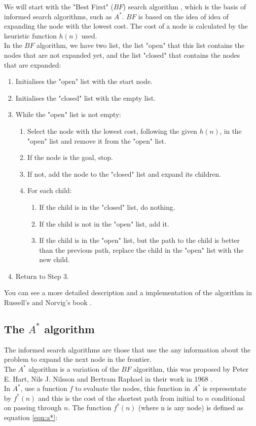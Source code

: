 \documentclass[runningheads]{llncs}
\begin{document}
We will start with the "Best First" (\(BF\)) search algorithm \cite{algorithms}, which is the basis of informed search algorithms, such as \(A^*\).
\(BF\) is based on the idea of idea of expanding the node with the lowest cost. The cost of a node is calculated by the heuristic function \(h(n)\) used. \\
In the \(BF\) algorithm, we have two list, the list "open" that this list contains the nodes that are not expanded yet, and the list "closed" that contains the nodes that are expanded:
\begin{enumerate}
\item Initialises the "open" list with the start node.
\item Initialises the "closed" list with the empty list.
\item While the "open" list is not empty:
\begin{enumerate}
\item Select the node with the lowest cost, following the given \(h(n)\), in the "open" list and remove it from the "open" list.
\item If the node is the goal, stop.
\item If not, add the node to the "closed" list and expand its children.
\item For each child:
\begin{enumerate}
\item If the child is in the "closed" list, do nothing.
\item If the child is not in the "open" list, add it.
\item If the child is in the "open" list, but the path to the child is better than the previous path, replace the child in the "open" list with the new child.
\end{enumerate}
\end{enumerate}
\item Return to Step 3.
\end{enumerate}
You can see a more detailed description and a implementation of the algorithm in Russell's and Norvig's book \cite{algorithms_2}.

\subsection{The \(A^*\) algorithm}

The informed search algorithms are those that use the any information about the problem to expand the next node in the frontier.\\
The \(A^*\) algorithm is a variation of the \(BF\) algorithm, this was proposed by Peter E. Hart, Nils J. Nilsson and Bertram Raphael in their work in 1968 \cite{algorithms_3}.\\
In \(A^*\), use a function \(f\) to evaluate the nodes, this function in \(A^*\) is representate by \(f^*(n)\) and this is the cost of the shortest path from initial to \(n\) conditional on passing through \(n\).
The function \(f^*(n)\) (where n is any node) is defined as equation \ref{eqn:a*}:
\end{document}
